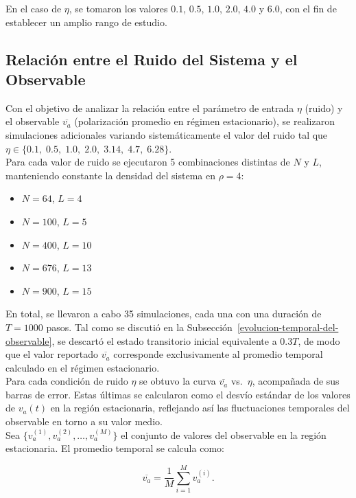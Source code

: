 \documentclass[12pt,a4paper]{article}
\begin{document}
En el caso de $\eta$, se tomaron los valores $0.1$, $0.5$, $1.0$, $2.0$, $4.0$ y $6.0$, con el fin de establecer un amplio rango de estudio.

\subsection{Relación entre el Ruido del Sistema y el Observable}
\label{curva-input-vs-observable}

Con el objetivo de analizar la relación entre el parámetro de entrada $\eta$ (ruido) y el observable $\overline{v_a}$ (polarización promedio en régimen estacionario), se realizaron simulaciones adicionales variando sistemáticamente el valor del ruido tal que $
\eta \in \{0.1,\;0.5,\;1.0,\;2.0,\;3.14,\;4.7,\;6.28\}
$.\\

Para cada valor de ruido se ejecutaron 5 combinaciones distintas de $N$ y $L$, manteniendo constante la densidad del sistema en $\rho = 4$:
\begin{itemize}
    \item $N=64$, $L=4$
    \item $N=100$, $L=5$
    \item $N=400$, $L=10$
    \item $N=676$, $L=13$
    \item $N=900$, $L=15$
\end{itemize}

En total, se llevaron a cabo 35 simulaciones, cada una con una duración de $T=1000$ pasos. Tal como se discutió en la Subsección~\ref{evolucion-temporal-del-observable}, se descartó el estado transitorio inicial equivalente a $0.3T$, de modo que el valor reportado $\overline{v_a}$ corresponde exclusivamente al promedio temporal calculado en el régimen estacionario.\\

Para cada condición de ruido $\eta$ se obtuvo la curva $\overline{v_a}$ vs.\ $\eta$, acompañada de sus barras de error. Estas últimas se calcularon como el desvío estándar de los valores de $v_a(t)$ en la región estacionaria, reflejando así las fluctuaciones temporales del observable en torno a su valor medio.\\

Sea $\{ v_a^{(1)}, v_a^{(2)}, \dots, v_a^{(M)} \}$ el conjunto de valores del observable en la región estacionaria. 
El promedio temporal se calcula como:

\begin{equation}
    \overline{v_a} = \frac{1}{M} \sum_{i=1}^{M} v_a^{(i)} .
\end{equation}
\end{document}
